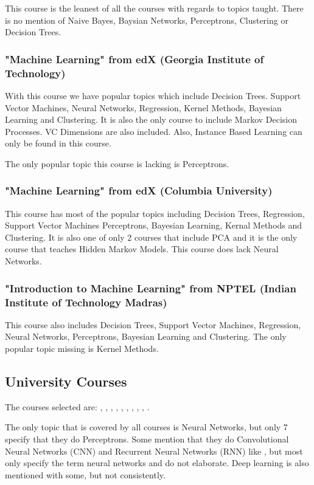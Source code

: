 \documentclass[10pt,a4paper]{article}
\begin{document}
This course is the leanest of all the courses with regards to topics taught. There is no mention of Naive Bayes, Baysian Networks, Perceptrons, Clustering or Decision Trees. \citep{cal}

\subsubsection{"Machine Learning" from edX (Georgia Institute of Technology)}
 
With this course we have popular topics which include Decision Trees. Support Vector Machines, Neural Networks, Regression, Kernel Methods, Bayesian Learning and Clustering. It is also the only course to include Markov Decision Processes. VC Dimensions are also included. Also, Instance Based Learning can only be found in this course.
 
The only popular topic this course is lacking is Perceptrons.\citep{georg}

\subsubsection{"Machine Learning" from edX (Columbia University)}

This course has most of the popular topics including Decision Trees, Regression, Support Vector Machines Perceptrons, Bayesian Learning, Kernal Methods and Clustering. It is also one of only 2 courses that include PCA and it is the only course that teaches Hidden Markov Models.
This course does lack Neural Networks. \citep{col}

\subsubsection{"Introduction to Machine Learning" from NPTEL (Indian Institute of Technology Madras)}

This course also includes Decision Trees, Support Vector Machines, Regression, Neural Networks, Perceptrons, Bayesian Learning and Clustering.
The only popular topic missing is Kernel Methods. \citep{mad}

\subsection{University Courses}
The courses selected are: \cite{stan1}, \cite{buf}, \cite{mit}, \cite{prince}, \cite{ucla},
\cite{mic}, \cite{nor}, \cite{col1}, \cite{mel}, \cite{was}.

The only topic that is covered by all courses is Neural Networks, but only 7 specify that they do Perceptrons. Some mention that they do Convolutional Neural Networks (CNN) and Recurrent Neural Networks (RNN) like \cite{nor}, but most only specify the term neural networks and do not elaborate. Deep learning is also mentioned with some, but not consistently.
\end{document}
